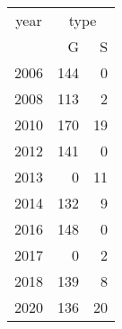 \footnotesize\begin{tabular}[t]{lrr}
\toprule
\multicolumn{1}{c}{year} & \multicolumn{2}{c}{type} \\
\cmidrule(l{3pt}r{3pt}){1-1} \cmidrule(l{3pt}r{3pt}){2-3}
  & G & S\\
\midrule
2006 & 144 & 0\\
2008 & 113 & 2\\
2010 & 170 & 19\\
2012 & 141 & 0\\
2013 & 0 & 11\\
2014 & 132 & 9\\
2016 & 148 & 0\\
2017 & 0 & 2\\
2018 & 139 & 8\\
2020 & 136 & 20\\
\bottomrule
\end{tabular}
